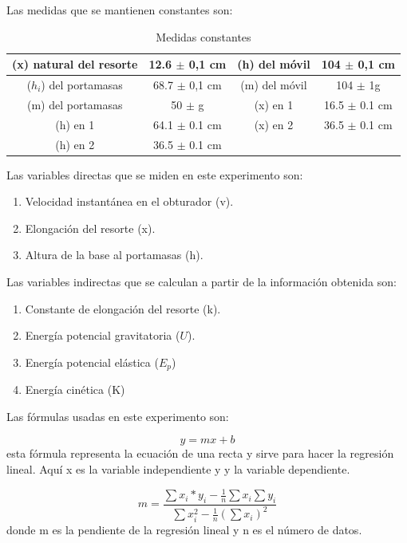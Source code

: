 \documentclass[a4paper]{article}
\begin{document}
Las medidas que se mantienen constantes son:

\begin{table}[H]
    \centering
    \begin{tabular}{|c|c|c|c|}
    \hline
        (x) natural del resorte & 12.6 $\pm$ 0,1 cm & (h) del móvil & 104 $\pm$ 0,1 cm   \\ \hline
       ($h_i$) del portamasas & 68.7 $\pm$ 0,1 cm & (m) del móvil & 104 $\pm$ 1g \\ \hline 
       (m) del portamasas & 50 $\pm$ g & (x) en 1 & 16.5 $\pm$ 0.1 cm \\ \hline
       (h) en 1 & 64.1 $\pm$ 0.1 cm & (x) en 2 & 36.5 $\pm$ 0.1 cm \\ \hline
       (h) en 2 & 36.5 $\pm$ 0.1 cm & & \\ \hline
             
    \end{tabular}
    \caption{Medidas constantes}
    \label{Medidas constante}
\end{table}

Las variables directas que se miden en este experimento son:
\begin{enumerate}
  \item Velocidad instantánea en el obturador (v).
  \item Elongación del resorte (x).
  \item Altura de la base al portamasas (h).
\end{enumerate}

Las variables indirectas que se calculan a partir de la información obtenida son:
\begin{enumerate}
  \item Constante de elongación del resorte (k).
  \item Energía potencial gravitatoria ($U$).
  \item Energía potencial elástica ($E_p$)
  \item Energía cinética (K)
\end{enumerate}

Las fórmulas usadas en este experimento son:

\begin{equation}
    y=mx+b
\end{equation}
esta fórmula representa la ecuación de una recta y sirve para hacer la regresión lineal. Aquí x es la variable independiente y y la variable dependiente. 

\begin{equation}
   m=\frac{\sum x_i*y_i-\frac{1}{n}\sum x_i \sum y_i}{\sum x_i^2-\frac{1}{n}(\sum x_i)^2} 
\end{equation}
donde m es la pendiente de la regresión lineal y n es el número de datos.
\end{document}
